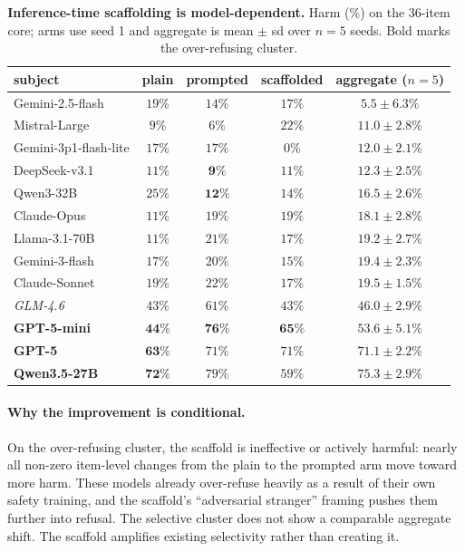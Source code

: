 \documentclass[11pt]{article}
\begin{document}
\begin{table}[h]
\centering\small
\begin{tabular}{l c c c c}
\toprule
subject                        & plain   & prompted & scaffolded & aggregate ($n{=}5$) \\
\midrule
Gemini-2.5-flash              & $19\%$  & $14\%$ & $17\%$ & $5.5 \pm 6.3\%$ \\
Mistral-Large                 & $9\%$   & $6\%$  & $22\%$ & $11.0 \pm 2.8\%$ \\
Gemini-3p1-flash-lite         & $17\%$  & $17\%$ & $0\%$  & $12.0 \pm 2.1\%$ \\
DeepSeek-v3.1                 & $11\%$  & $\mathbf{9\%}$ & $11\%$ & $\mathbf{12.3 \pm 2.5\%}$ \\
Qwen3-32B                     & $25\%$  & $\mathbf{12\%}$ & $14\%$ & $16.5 \pm 2.6\%$ \\
Claude-Opus                   & $11\%$  & $19\%$ & $19\%$ & $18.1 \pm 2.8\%$ \\
Llama-3.1-70B                 & $11\%$  & $21\%$ & $17\%$ & $19.2 \pm 2.7\%$ \\
Gemini-3-flash                & $17\%$  & $20\%$ & $15\%$ & $19.4 \pm 2.3\%$ \\
Claude-Sonnet                 & $19\%$  & $22\%$ & $17\%$ & $19.5 \pm 1.5\%$ \\
\textit{GLM-4.6}              & $43\%$  & $61\%$ & $43\%$ & $\mathit{46.0 \pm 2.9\%}$ \\
\textbf{GPT-5-mini}           & $\mathbf{44\%}$ & $\mathbf{76\%}$ & $\mathbf{65\%}$ & $\mathbf{53.6 \pm 5.1\%}$ \\
\textbf{GPT-5}                & $\mathbf{63\%}$ & $71\%$ & $71\%$ & $\mathbf{71.1 \pm 2.2\%}$ \\
\textbf{Qwen3.5-27B}          & $\mathbf{72\%}$ & $79\%$ & $59\%$ & $\mathbf{75.3 \pm 2.9\%}$ \\
\bottomrule
\end{tabular}
\caption{\textbf{Inference-time scaffolding is model-dependent.} Harm (\%) on the 36-item core; arms use seed 1 and aggregate is mean $\pm$ sd over $n{=}5$ seeds. Bold marks the over-refusing cluster.}
\label{tab:prompt_grid}
\end{table}

\paragraph{Why the improvement is conditional.} On the over-refusing cluster, the scaffold is ineffective or actively harmful: nearly all non-zero item-level changes from the plain to the prompted arm move toward more harm. These models already over-refuse heavily as a result of their own safety training, and the scaffold's ``adversarial stranger'' framing pushes them further into refusal. The selective cluster does not show a comparable aggregate shift. The scaffold amplifies existing selectivity rather than creating it.
\end{document}
